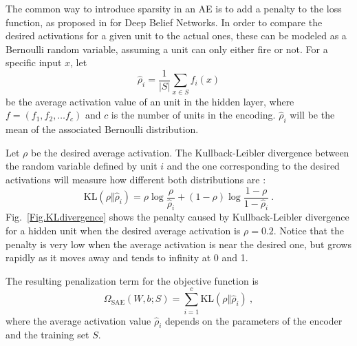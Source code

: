 \documentclass[preprint,5p,compress]{elsarticle}
\begin{document}
The common way to introduce sparsity in an AE is to add a penalty to the loss function, as proposed in \cite{lee_sparse_2008} for Deep Belief Networks. In order to compare the desired activations for a given unit to the actual ones, these can be modeled as a Bernoulli random variable, assuming a unit can only either fire or not. For a specific input $x$, let
\begin{equation}
  \hat\rho_i=\frac{1}{\left\lvert S\right\rvert} \sum_{x\in S} f_i(x)
\end{equation}
be the average activation value of an unit in the hidden layer, where $f=(f_1,f_2,\dots f_c)$ and $c$ is the number of units in the encoding. $\hat\rho_i$ will be the mean of the associated Bernoulli distribution.

Let $\rho$ be the desired average activation. The Kullback-Leibler divergence \cite{kullback1951information} between the random variable defined by unit $i$ and the one corresponding to the desired activations will measure how different both distributions are \cite{ng2011sparse}:
\begin{equation}\label{Eq.KLdivergence}
  \mathrm{KL}(\rho\Vert \hat\rho_i)=\rho \log\frac\rho{\hat\rho_i} + (1 - \rho)\log\frac{1 - \rho}{1 - \hat\rho_i}~.
\end{equation}
Fig.~\ref{Fig.KLdivergence} shows the penalty caused by Kullback-Leibler divergence for a hidden unit when the desired average activation is $\rho=0.2$. Notice that the penalty is very low when the average activation is near the desired one, but grows rapidly as it moves away and tends to infinity at 0 and 1.

The resulting penalization term for the objective function is
\begin{equation}
  \Omega_{\mathrm{SAE}}(W,b;S)=\sum_{i=1}^c \mathrm{KL}(\rho\Vert \hat\rho_i)~,
\end{equation}
where the average activation value $\hat\rho_i$ depends on the parameters of the encoder and the training set $S$.
\end{document}
